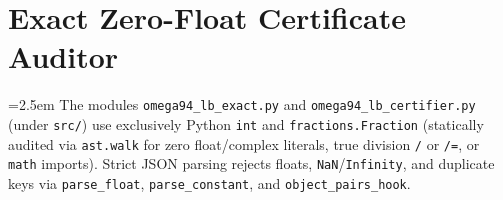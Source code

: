 \documentclass[10pt,twocolumn]{article}
\begin{document}
\section{Exact Zero-Float Certificate Auditor}\label{sec:certifier}
{\emergencystretch=2.5em
The modules \texttt{omega94\_\allowbreak lb\_\allowbreak exact.py} and \texttt{omega94\_\allowbreak lb\_\allowbreak certifier.py} (under \texttt{src/}) use exclusively Python \texttt{int} and \texttt{fractions.\allowbreak Fraction} (statically audited via \texttt{ast.walk} for zero float/complex literals, true division \texttt{/} or \texttt{/=}, or \texttt{math} imports). Strict JSON parsing rejects floats, \texttt{NaN}/\texttt{Infinity}, and duplicate keys via \texttt{parse\_\allowbreak float}, \texttt{parse\_\allowbreak constant}, and \texttt{object\_\allowbreak pairs\_\allowbreak hook}.

}
\end{document}
